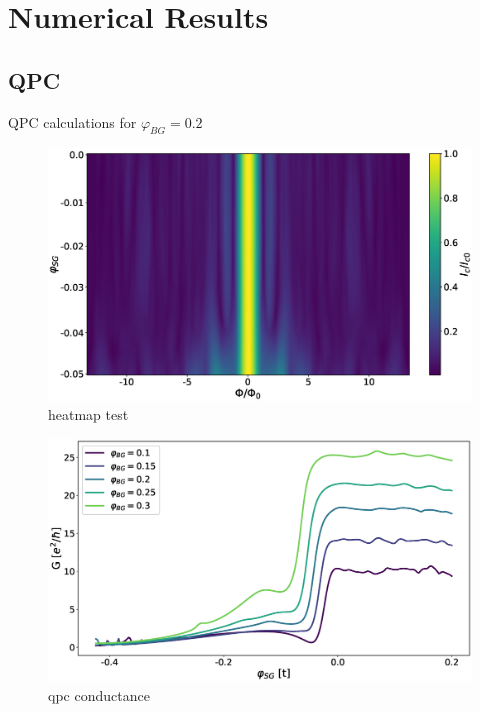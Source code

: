 \chapter{Numerical Results}
\label{ch:numerical-results}

\section{QPC}
QPC calculations for $\varphi_{BG} = 0.2$
\begin{figure}
\includegraphics[width=\textwidth]{figure/numericalmodel/qpc_icnorm_heatmap}
\caption{heatmap test}
\end{figure}

\begin{figure}
\includegraphics[width=\textwidth]{figure/numericalmodel/qpc-conductance}
\caption{qpc conductance}
\end{figure}

